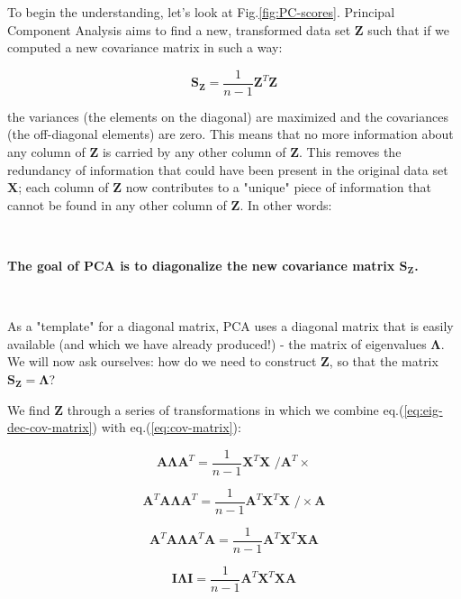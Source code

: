 \documentclass[10pt,twocolumn]{article}
\begin{document}
To begin the understanding, let's look at Fig.\ref{fig:PC-scores}. Principal Component Analysis aims to find a new, transformed data set $\bm{Z}$ such that if we computed a new covariance matrix in such a way:

\begin{equation}
\bm{S_Z} =  \frac{1}{n-1} \bm{Z}^T \bm{Z}
\end{equation}

the variances (the elements on the diagonal) are maximized and the covariances (the off-diagonal elements) are zero. This means that no more information about any column of $\bm{Z}$ is carried by any other column of $\bm{Z}$. This removes the redundancy of information that could have been present in the original data set $\bm{X}$; each column of $\bm{Z}$ now contributes to a "unique" piece of information that cannot be found in any other column of $\bm{Z}$. In other words:

\,\,

\textbf{The goal of PCA is to diagonalize the new covariance matrix $\bm{S_Z}$.}

\,\,

As a "template" for a diagonal matrix, PCA uses a diagonal matrix that is easily available (and which we have already produced!) - the matrix of eigenvalues $\bm{\Lambda}$. We will now ask ourselves: how do we need to construct $\bm{Z}$, so that the matrix $\bm{S_Z} = \bm{\Lambda}$?

We find $\bm{Z}$ through a series of transformations in which we combine eq.(\ref{eq:eig-dec-cov-matrix}) with eq.(\ref{eq:cov-matrix}):

\begin{equation}
\bm{A} \bm{\Lambda} \bm{A}^T =  \frac{1}{n-1} \bm{X}^T \bm{X} \,\, \Big/ \bm{A}^T \times
\end{equation}

\begin{equation}
\bm{A}^T \bm{A} \bm{\Lambda} \bm{A}^T =  \frac{1}{n-1} \bm{A}^T  \bm{X}^T \bm{X} \,\, \Big/ \times \bm{A}
\end{equation}

\begin{equation}
\bm{A}^T \bm{A} \bm{\Lambda} \bm{A}^T \bm{A} =  \frac{1}{n-1} \bm{A}^T  \bm{X}^T \bm{X} \bm{A}
\end{equation}

\begin{equation}
\bm{I} \bm{\Lambda} \bm{I} =  \frac{1}{n-1} \bm{A}^T  \bm{X}^T \bm{X} \bm{A}
\end{equation}
\end{document}
